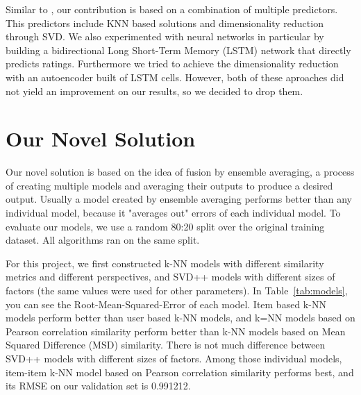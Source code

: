 \documentclass[10pt,conference,compsocconf]{IEEEtran}
\newcommand{\rtab}[1]{Table~\ref{tab:#1}}
\begin{document}
Similar to \cite{paterek}, our contribution is based on a combination of multiple predictors. This predictors include KNN based solutions and dimensionality reduction through SVD. We also experimented with neural networks in particular by building a bidirectional Long Short-Term Memory (LSTM) network that directly predicts ratings. Furthermore we tried to achieve the dimensionality reduction with an autoencoder built of LSTM cells. However, both of these aproaches did not yield an improvement on our results, so we decided to drop them.

\section{Our Novel Solution}
Our novel solution is based on the idea of fusion by ensemble averaging, a process of creating multiple models and averaging their outputs to produce a desired output\cite{ariel}. Usually a model created by ensemble averaging performs better than any individual model, because it "averages out" errors of each individual model. To evaluate our models, we use a random 80:20 split over the original training dataset. All algorithms ran on the same split. 

For this project, we first constructed k-NN models with different similarity metrics and different perspectives, and SVD++ models with different sizes of factors (the same values were used for other parameters). In \rtab{models}, you can see the Root-Mean-Squared-Error of each model. Item based k-NN models perform better than user based k-NN models, and k=NN models based on Pearson correlation similarity perform better than k-NN models based on Mean Squared Difference (MSD) similarity. There is not much difference between SVD++ models with different sizes of factors. Among those individual models, item-item k-NN model based on Pearson correlation similarity performs best, and its RMSE on our validation set is 0.991212.
\end{document}
